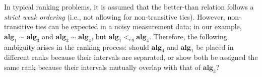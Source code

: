 \documentclass[acmsmall,screen, review]{acmart}
\begin{document}
In typical ranking problems, it is assumed that the better-than relation follows a \textit{strict weak ordering} (i.e., not allowing for non-transitive ties). However, non-transitive ties can be expected in a noisy measurement data; in our example, $\mathbf{alg}_{1} \sim \mathbf{alg}_{3}$ and $\mathbf{alg}_{3} \sim \mathbf{alg}_{4}$, but $\mathbf{alg}_{1} <_{eg} \mathbf{alg}_{4}$. Therefore, the following ambiguity arises in the ranking process: should $\mathbf{alg}_{4}$ and $\mathbf{alg}_{1}$ be placed in different ranks because their intervals are separated, or show both be assigned the same rank because their intervals mutually overlap with that of $\mathbf{alg}_{3}$? 

\end{document}
